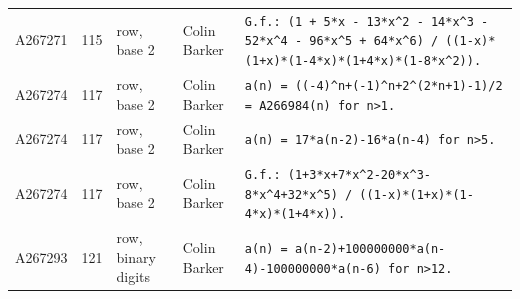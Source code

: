 \documentclass[11pt]{article}
\theoremstyle{definition}
\theoremstyle{remark}
\begin{document}
{\begin{longtable}{p{1.3cm}p{0.7cm}p{2.4cm}p{2.3cm}p{7.3cm}}
A267271 & 115 & row, base 2 & Colin Barker & \texttt{G.f.: \allowbreak{}(1 \allowbreak{}+\allowbreak{} \allowbreak{}5*\allowbreak{}x \allowbreak{}-\allowbreak{} \allowbreak{}13*\allowbreak{}x\^{}2 \allowbreak{}-\allowbreak{} \allowbreak{}14*\allowbreak{}x\^{}3 \allowbreak{}-\allowbreak{} \allowbreak{}52*\allowbreak{}x\^{}4 \allowbreak{}-\allowbreak{} \allowbreak{}96*\allowbreak{}x\^{}5 \allowbreak{}+\allowbreak{} \allowbreak{}64*\allowbreak{}x\^{}6)\allowbreak{} \allowbreak{}/\allowbreak{} \allowbreak{}((1-\allowbreak{}x)\allowbreak{}*\allowbreak{}(1+\allowbreak{}x)\allowbreak{}*\allowbreak{}(1-\allowbreak{}4*\allowbreak{}x)\allowbreak{}*\allowbreak{}(1+\allowbreak{}4*\allowbreak{}x)\allowbreak{}*\allowbreak{}(1-\allowbreak{}8*\allowbreak{}x\^{}2)\allowbreak{})\allowbreak{}.} \\
A267274 & 117 & row, base 2 & Colin Barker & \texttt{a(n)\allowbreak{} \allowbreak{}=\allowbreak{} \allowbreak{}((-\allowbreak{}4)\allowbreak{}\^{}n+\allowbreak{}(-\allowbreak{}1)\allowbreak{}\^{}n+\allowbreak{}2\^{}(2*\allowbreak{}n+\allowbreak{}1)\allowbreak{}-\allowbreak{}1)\allowbreak{}/\allowbreak{}2 \allowbreak{}=\allowbreak{} \allowbreak{}A266984(n)\allowbreak{} \allowbreak{}for \allowbreak{}n>1.} \\
A267274 & 117 & row, base 2 & Colin Barker & \texttt{a(n)\allowbreak{} \allowbreak{}=\allowbreak{} \allowbreak{}17*\allowbreak{}a(n-\allowbreak{}2)\allowbreak{}-\allowbreak{}16*\allowbreak{}a(n-\allowbreak{}4)\allowbreak{} \allowbreak{}for \allowbreak{}n>5.} \\
A267274 & 117 & row, base 2 & Colin Barker & \texttt{G.f.: \allowbreak{}(1+\allowbreak{}3*\allowbreak{}x+\allowbreak{}7*\allowbreak{}x\^{}2-\allowbreak{}20*\allowbreak{}x\^{}3-\allowbreak{}8*\allowbreak{}x\^{}4+\allowbreak{}32*\allowbreak{}x\^{}5)\allowbreak{} \allowbreak{}/\allowbreak{} \allowbreak{}((1-\allowbreak{}x)\allowbreak{}*\allowbreak{}(1+\allowbreak{}x)\allowbreak{}*\allowbreak{}(1-\allowbreak{}4*\allowbreak{}x)\allowbreak{}*\allowbreak{}(1+\allowbreak{}4*\allowbreak{}x)\allowbreak{})\allowbreak{}.} \\
A267293 & 121 & row, binary digits & Colin Barker & \texttt{a(n)\allowbreak{} \allowbreak{}=\allowbreak{} \allowbreak{}a(n-\allowbreak{}2)\allowbreak{}+\allowbreak{}100000000*\allowbreak{}a(n-\allowbreak{}4)\allowbreak{}-\allowbreak{}100000000*\allowbreak{}a(n-\allowbreak{}6)\allowbreak{} \allowbreak{}for \allowbreak{}n>12.} \\

\end{longtable}}
\end{document}
